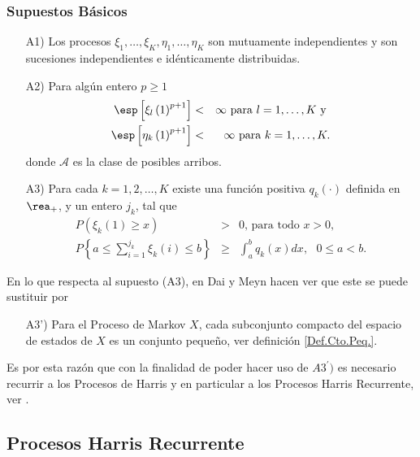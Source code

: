 \subsubsection{Supuestos B\'asicos}
\begin{itemize}
\item[A1)] Los procesos
$\xi_{1},\ldots,\xi_{K},\eta_{1},\ldots,\eta_{K}$ son mutuamente
independientes y son sucesiones independientes e id\'enticamente
distribuidas.

\item[A2)] Para alg\'un entero $p\geq1$
\begin{eqnarray*}
\esp\left[\xi_{l}\left(1\right)^{p+1}\right]&<&\infty\textrm{ para }l=1,\ldots,K\textrm{ y }\\
\esp\left[\eta_{k}\left(1\right)^{p+1}\right]&<&\infty\textrm{
para }k=1,\ldots,K.
\end{eqnarray*}
donde $\mathcal{A}$ es la clase de posibles arribos.

\item[A3)] Para cada $k=1,2,\ldots,K$ existe una funci\'on
positiva $q_{k}\left(\cdot\right)$ definida en $\rea_{+}$, y un
entero $j_{k}$, tal que
\begin{eqnarray}
P\left(\xi_{k}\left(1\right)\geq x\right)&>&0\textrm{, para todo }x>0,\\
P\left\{a\leq\sum_{i=1}^{j_{k}}\xi_{k}\left(i\right)\leq
b\right\}&\geq&\int_{a}^{b}q_{k}\left(x\right)dx, \textrm{ }0\leq
a<b.
\end{eqnarray}
\end{itemize}

En lo que respecta al supuesto (A3), en Dai y Meyn \cite{DaiSean}
hacen ver que este se puede sustituir por

\begin{itemize}
\item[A3')] Para el Proceso de Markov $X$, cada subconjunto
compacto del espacio de estados de $X$ es un conjunto peque\~no,
ver definici\'on \ref{Def.Cto.Peq.}.
\end{itemize}

Es por esta raz\'on que con la finalidad de poder hacer uso de
$A3^{'})$ es necesario recurrir a los Procesos de Harris y en
particular a los Procesos Harris Recurrente, ver \cite{Dai,
DaiSean}.
\subsection{Procesos Harris Recurrente}

